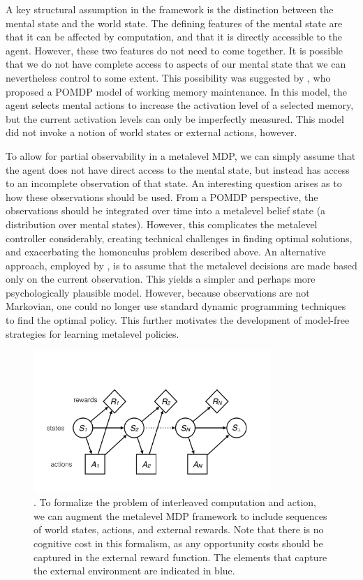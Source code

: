 A key structural assumption in the framework is the distinction between the mental state and the world state. The defining features of the mental state are that it can be affected by computation, and that it is directly accessible to the agent. However, these two features do not need to come together. It is possible that we do not have complete access to aspects of our mental state that we can nevertheless control to some extent. This possibility was suggested by \citet{suchow2016deciding}, who proposed a POMDP model of working memory maintenance. In this model, the agent selects mental actions to increase the activation level of a selected memory, but the current activation levels can only be imperfectly measured. This model did not invoke a notion of world states or external actions, however.

To allow for partial observability in a metalevel MDP, we can simply assume that the agent does not have direct access to the mental state, but instead has access to an incomplete observation of that state. An interesting question arises as to how these observations should be used. From a POMDP perspective, the observations should be integrated over time into a metalevel belief state (a distribution over mental states). However, this complicates the metalevel controller considerably, creating technical challenges in finding optimal solutions, and exacerbating the homonculus problem described above. An alternative approach, employed by \citet{suchow2016deciding}, is to assume that the metalevel decisions are made based only on the current observation. This yields a simpler and perhaps more psychologically plausible model. However, because observations are not Markovian, one could no longer use standard dynamic programming techniques to find the optimal policy. This further motivates the development of model-free strategies for learning metalevel policies.

\begin{figure}
  \centering
  \includegraphics[width=0.8\textwidth,page=2,trim=0 100 0 50]{diagrams/metamdp.pdf}
  \caption{. To formalize the problem of interleaved computation and action, we can augment the metalevel MDP framework to include sequences of world states, actions, and external rewards. Note that there is no cognitive cost in this formalism, as any opportunity costs should be captured in the external reward function. The elements that capture the external environment are indicated in blue.
  }
  \label{fig:metamdp-joint}
\end{figure}


